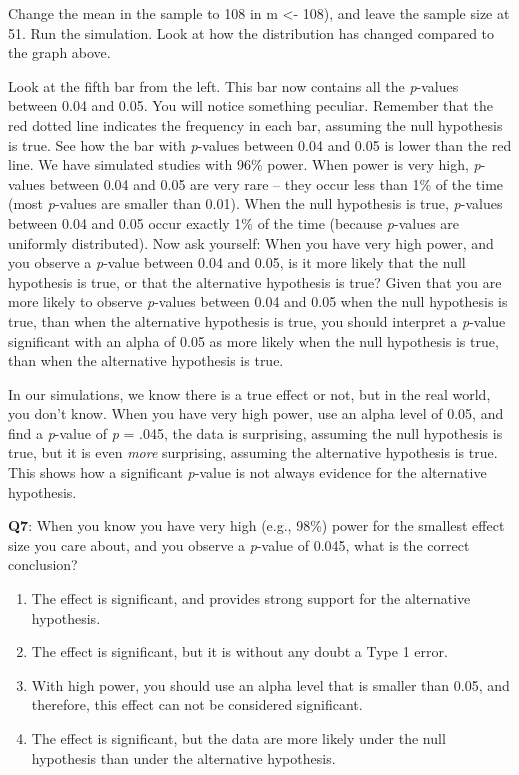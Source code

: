 \documentclass[
  oneside]{book}
\providecommand{\tightlist}{%
  \setlength{\itemsep}{0pt}\setlength{\parskip}{0pt}}
\begin{document}
Change the mean in the sample to 108 in m \textless- 108), and leave the sample size at 51. Run the simulation. Look at how the distribution has changed compared to the graph above.

Look at the fifth bar from the left. This bar now contains all the \emph{p}-values between 0.04 and 0.05. You will notice something peculiar. Remember that the red dotted line indicates the frequency in each bar, assuming the null hypothesis is true. See how the bar with \emph{p}-values between 0.04 and 0.05 is lower than the red line. We have simulated studies with 96\% power. When power is very high, \emph{p}-values between 0.04 and 0.05 are very rare -- they occur less than 1\% of the time (most \emph{p}-values are smaller than 0.01). When the null hypothesis is true, \emph{p}-values between 0.04 and 0.05 occur exactly 1\% of the time (because \emph{p}-values are uniformly distributed). Now ask yourself: When you have very high power, and you observe a \emph{p}-value between 0.04 and 0.05, is it more likely that the null hypothesis is true, or that the alternative hypothesis is true? Given that you are more likely to observe \emph{p}-values between 0.04 and 0.05 when the null hypothesis is true, than when the alternative hypothesis is true, you should interpret a \emph{p}-value significant with an alpha of 0.05 as more likely when the null hypothesis is true, than when the alternative hypothesis is true.

In our simulations, we know there is a true effect or not, but in the real world, you don't know. When you have very high power, use an alpha level of 0.05, and find a \emph{p}-value of \emph{p} = .045, the data is surprising, assuming the null hypothesis is true, but it is even \emph{more} surprising, assuming the alternative hypothesis is true. This shows how a significant \emph{p}-value is not always evidence for the alternative hypothesis.

\textbf{Q7}: When you know you have very high (e.g., 98\%) power for the smallest effect size you care about, and you observe a \emph{p}-value of 0.045, what is the correct conclusion?

\begin{enumerate}
\def\labelenumi{\Alph{enumi})}
\tightlist
\item
  The effect is significant, and provides strong support for the alternative hypothesis.
\item
  The effect is significant, but it is without any doubt a Type 1 error.
\item
  With high power, you should use an alpha level that is smaller than 0.05, and therefore, this effect can not be considered significant.
\item
  The effect is significant, but the data are more likely under the null hypothesis than under the alternative hypothesis.
\end{enumerate}
\end{document}

